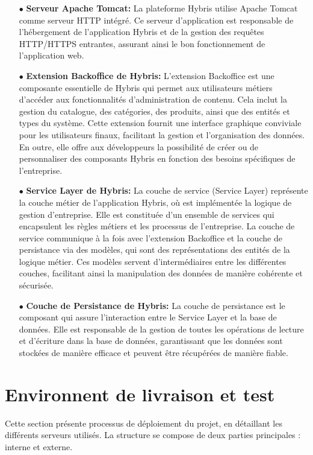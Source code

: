 \begin{itemize}
    \item [$\bullet$]\textbf{Serveur Apache Tomcat:} La plateforme Hybris utilise Apache Tomcat comme serveur HTTP intégré. Ce serveur d'application est responsable de l'hébergement de l'application Hybris et de la gestion des requêtes HTTP/HTTPS entrantes, assurant ainsi le bon fonctionnement de l'application web.
    \item [$\bullet$]\textbf{Extension Backoffice de Hybris:} L'extension Backoffice est une composante essentielle de Hybris qui permet aux utilisateurs métiers d'accéder aux fonctionnalités d'administration de contenu. Cela inclut la gestion du catalogue, des catégories, des produits, ainsi que des entités et types du système. Cette extension fournit une interface graphique conviviale pour les utilisateurs finaux, facilitant la gestion et l'organisation des données. En outre, elle offre aux développeurs la possibilité de créer ou de personnaliser des composants Hybris en fonction des besoins spécifiques de l'entreprise.
    \item [$\bullet$]\textbf{Service Layer de Hybris: }La couche de service (Service Layer) représente la couche métier de l'application Hybris, où est implémentée la logique de gestion d'entreprise. Elle est constituée d'un ensemble de services qui encapsulent les règles métiers et les processus de l'entreprise. La couche de service communique à la fois avec l'extension Backoffice et la couche de persistance via des modèles, qui sont des représentations des entités de la logique métier. Ces modèles servent d'intermédiaires entre les différentes couches, facilitant ainsi la manipulation des données de manière cohérente et sécurisée.
    \item [$\bullet$]\textbf{Couche de Persistance de Hybris:} La couche de persistance est le composant qui assure l'interaction entre le Service Layer et la base de données. Elle est responsable de la gestion de toutes les opérations de lecture et d'écriture dans la base de données, garantissant que les données sont stockées de manière efficace et peuvent être récupérées de manière fiable. 
\end{itemize}

\section{Environnent de livraison et test }


Cette section présente processus de déploiement du projet, en détaillant les différents serveurs utilisés. La structure se compose de deux parties principales : interne et externe.

